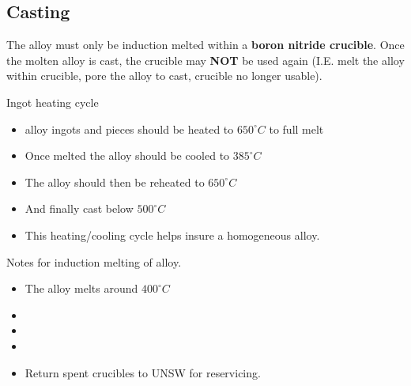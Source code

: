 \subsection{Casting}

The \MgZnCa alloy must only be induction melted within a \textbf{boron nitride crucible}. Once the molten alloy is cast, the crucible may \textbf{NOT} be used again (I.E. melt the alloy within crucible, pore the alloy to cast, crucible no longer usable). 

Ingot heating cycle
\begin{itemize}
\item \MgZnCa alloy ingots and pieces should be heated to $650^{\circ}C$ to full melt
\item Once melted the alloy should be cooled to $385^{\circ}C$
\item The alloy should then be reheated to $650^{\circ}C$
\item And finally cast below $500^{\circ}C$
\item This heating/cooling cycle helps insure a homogeneous alloy.
\end{itemize}

Notes for induction melting of \MgZnCa alloy.
\begin{itemize}
\item The \MgZnCa alloy melts around $400^{\circ}C$
\item 
\item 
\item
\item Return spent crucibles to UNSW for reservicing. 
\end{itemize}